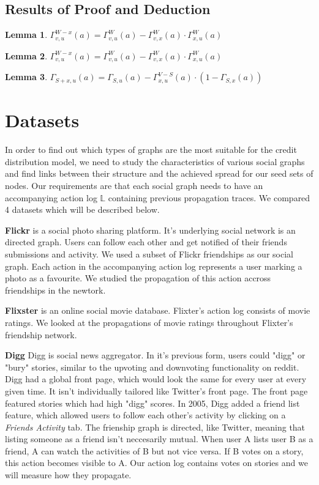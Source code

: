 \documentclass{acm_proc_article-sp}
\newtheorem{lem}{Lemma}
\begin{document}
\subsection*{Results of Proof and Deduction}
\begin{lem}
	$\Gamma_{v,u}^{W-x}(a) = \Gamma_{v,u}^W(a) - \Gamma_{v,x}^W(a) \cdot \Gamma_{x,u}^W(a)$
\end{lem}
\begin{lem}
	$\Gamma_{v,u}^{W-x}(a) = \Gamma_{v,u}^W (a) - \Gamma_{v,x}^W(a)\cdot\Gamma_{x,u}^W(a)$
\end{lem}
\begin{lem}
	$\Gamma_{S+x,u}(a) = \Gamma_{S,u}(a) - \Gamma_{x,u}^{V-S}(a) \cdot (1 - \Gamma_{S,x}(a) )$
\end{lem}



\section{Datasets}

In order to find out which types of graphs are the most suitable for the credit distribution model, we need to study the characteristics of various social graphs and find links between their structure and the achieved spread for our seed sets of nodes. Our requirements are that each social graph needs to have an accompanying action log $\mathbb{L}$ containing previous propagation traces. We compared 4 datasets which will be described below.

\textbf{Flickr} \cite{data:flickr} is a social photo sharing platform. It's underlying social network is an directed graph. Users can follow each other and get notified of their friends submissions and activity. We used a subset of Flickr friendships as our social graph. Each action in the accompanying action log represents a user marking a photo as a favourite. We studied the propagation of this action accross friendships in the newtork. \cite{data:flickr-paper}

\textbf{Flixster} \cite{data:flixster} is an online social movie database. Flixter's action log consists of movie ratings. We looked at the propagations of movie ratings throughout Flixter's friendship network. \cite{data:flixsterpaper}

\textbf{Digg} \cite{data:digg-friends,data:digg-votes,data:digg} Digg is social news aggregator. In it's previous form, users could "digg" or "bury" stories, similar to the upvoting and downvoting functionality on reddit. Digg had a global front page, which would look the same for every user at every given time. It isn't individually tailored like Twitter's front page. The front page featured stories which had high "digg" scores. In 2005, Digg added a friend list feature, which allowed users to follow each other's activity by clicking on a \textit{Friends Activity} tab. The frienship graph is directed, like Twitter, meaning that listing someone as a friend isn't neccesarily mutual. When user A lists user B as a friend, A can watch the activities of B but not vice versa. If B votes on a story, this action becomes visible to A. Our action log contains votes on stories and we will measure how they propagate. \cite{DBLP:journals/corr/abs-1202-3162}
\end{document}
